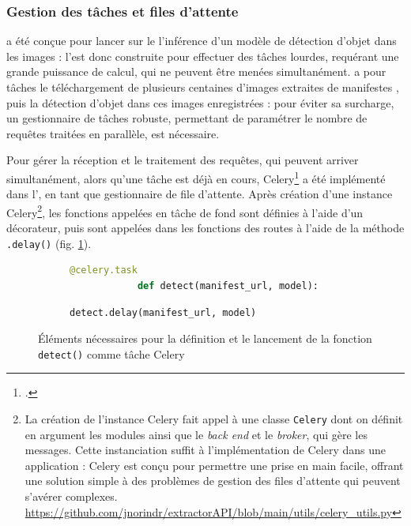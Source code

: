 	\subsubsection{Gestion des tâches et files d'attente}
	\exapi a été conçue pour lancer sur le \gpu l'inférence d'un modèle de détection d'objet dans les images : l'\api est donc construite pour effectuer des tâches lourdes, requérant une grande puissance de calcul, qui ne peuvent être menées simultanément. \exapi a pour tâches le téléchargement de plusieurs centaines d'images extraites de manifestes \iiif, puis la détection d'objet dans ces images enregistrées : pour éviter sa surcharge, un gestionnaire de tâches robuste, permettant de paramétrer le nombre de requêtes traitées en parallèle, est nécessaire.
	
	Pour gérer la réception et le traitement des requêtes, qui peuvent arriver simultanément, alors qu'une tâche est déjà en cours, Celery\footcite{CeleryDistributedTask} a été implémenté dans l'\api, en tant que gestionnaire de file d'attente. Après création d'une instance Celery\footnote{La création de l'instance Celery fait appel à une classe \texttt{Celery} dont on définit en argument les modules ainsi que le \textit{back end} et le \textit{broker}, qui gère les messages. Cette instanciation suffit à l'implémentation de Celery dans une application : Celery est conçu pour permettre une prise en main facile, offrant une solution simple à des problèmes de gestion des files d'attente qui peuvent s'avérer complexes. \url{https://github.com/jnorindr/extractorAPI/blob/main/utils/celery_utils.py}}, les fonctions appelées en tâche de fond sont définies à l'aide d'un décorateur, puis sont appelées dans les fonctions des routes à l'aide de la méthode \texttt{.delay()} (fig. \ref{fig:celery_exapi}).
	
	\begin{figure}[h]
		\begin{subfigure}{1\linewidth}
			\begin{lstlisting}[language=Python]
			@celery.task
			def detect(manifest_url, model):\end{lstlisting}
		\end{subfigure}
		\begin{subfigure}{1\linewidth}
			\begin{lstlisting}[language=Python]
			detect.delay(manifest_url, model)\end{lstlisting}
		\end{subfigure}
		\caption{Éléments nécessaires pour la définition et le lancement de la fonction \texttt{detect()} comme tâche Celery}
		\label{fig:celery_exapi}
	\end{figure}

